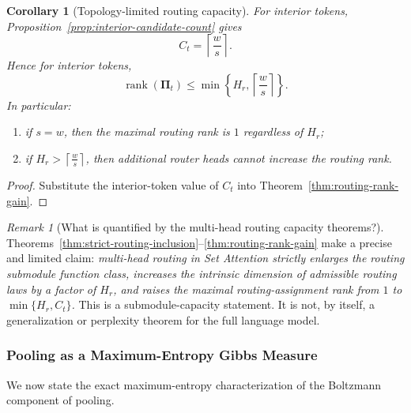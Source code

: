 \documentclass{article}
\theoremstyle{plain}
\newtheorem{corollary}[theorem]{Corollary}
\theoremstyle{definition}
\theoremstyle{remark}
\newtheorem{remark}[theorem]{Remark}
\begin{document}
\begin{corollary}[Topology-limited routing capacity]
\label{cor:topology-limited-routing-capacity}
For interior tokens, Proposition~\ref{prop:interior-candidate-count} gives
\[
C_{t}
=
\left\lceil \frac{w}{s}\right\rceil.
\]
Hence for interior tokens,
\begin{equation}
\label{eq:topology-limited-rank}
\operatorname{rank}(\boldsymbol{\Pi}_{t})
\le
\min\left\{H_r,\left\lceil \frac{w}{s}\right\rceil\right\}.
\end{equation}
In particular:
\begin{enumerate}
    \item if $s=w$, then the maximal routing rank is $1$ regardless of $H_r$;
    \item if $H_r > \left\lceil \frac{w}{s}\right\rceil$, then additional router heads cannot increase the routing rank.
\end{enumerate}
\end{corollary}

\begin{proof}
Substitute the interior-token value of $C_{t}$ into Theorem~\ref{thm:routing-rank-gain}.
\end{proof}

\begin{remark}[What is quantified by the multi-head routing capacity theorems?]
\label{rem:multihead-capacity-meaning}
Theorems~\ref{thm:strict-routing-inclusion}--\ref{thm:routing-rank-gain} make a precise and limited claim: \emph{multi-head routing in Set Attention strictly enlarges the routing submodule function class, increases the intrinsic dimension of admissible routing laws by a factor of $H_r$, and raises the maximal routing-assignment rank from $1$ to $\min\{H_r,C_{t}\}$.} This is a submodule-capacity statement. It is not, by itself, a generalization or perplexity theorem for the full language model.
\end{remark}

\subsubsection{Pooling as a Maximum-Entropy Gibbs Measure}
\label{sec:tier-a-pooling-maxent}

We now state the exact maximum-entropy characterization of the Boltzmann component of pooling.
\end{document}
